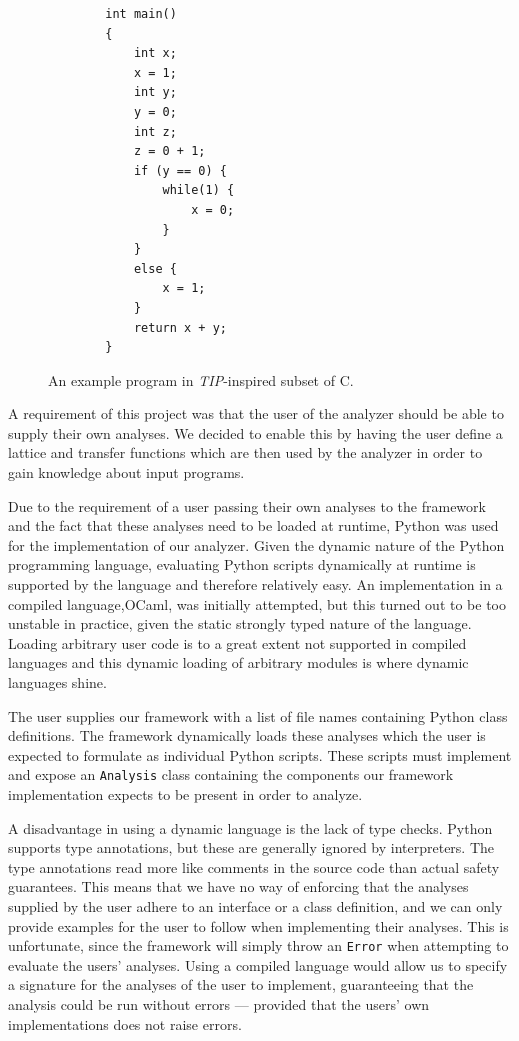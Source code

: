\begin{figure}[H]
    \centering
    \begin{verbatim}
        int main()
        {
            int x;
            x = 1;
            int y;
            y = 0;
            int z;
            z = 0 + 1;
            if (y == 0) {
                while(1) {
                    x = 0;
                }
            }
            else {
                x = 1;
            }
            return x + y;
        }
    \end{verbatim}
    \caption{An example program in \textit{TIP}-inspired subset of C.}
    \label{exampleprogram}
\end{figure}


\newpar A requirement of this project was that the user of the analyzer should be able to supply their own analyses. We decided to enable this by having the user define a lattice and transfer functions which are then used by the analyzer in order to gain knowledge about input programs.

\newpar Due to the requirement of a user passing their own analyses to the framework and the fact that these analyses need to be loaded at runtime, Python was used for the implementation of our analyzer. Given the dynamic nature of the Python programming language, evaluating Python scripts dynamically at runtime is supported by the language and therefore relatively easy. An implementation in a compiled language,OCaml, was initially attempted, but this turned out to be too unstable in practice, given the static strongly typed nature of the language. Loading arbitrary user code is to a great extent not supported in compiled languages and this dynamic loading of arbitrary modules is where dynamic languages shine. 

\newpar The user supplies our framework with a list of file names containing Python class definitions. The framework dynamically loads these analyses which the user is expected to formulate as individual Python scripts. These scripts must implement and expose an \texttt{Analysis} class containing the components our framework implementation expects to be present in order to analyze. 

\newpar A disadvantage in using a dynamic language is the lack of type checks. Python supports type annotations, but these are generally ignored by interpreters. The type annotations read more like comments in the source code than actual safety guarantees. This means that we have no way of enforcing that the analyses supplied by the user adhere to an interface or a class definition, and we can only provide examples for the user to follow when implementing their analyses. This is unfortunate, since the framework will simply throw an \texttt{Error} when attempting to evaluate the users' analyses. Using a compiled language would allow us to specify a signature for the analyses of the user to implement, guaranteeing that the analysis could be run without errors --- provided that the users' own implementations does not raise errors.

